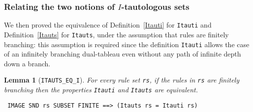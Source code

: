 \documentclass[a4paper]{article}
\newtheorem{lemma}{Lemma}
\newtheorem{definition}{Definition}
\newcommand{\hol}{\texttt{HOL4}}
\begin{document}

\subsubsection{Relating the two notions of $I$-tautologous sets}
\label{Itauti-Itauts}

We then proved the equivalence of 
Definition~\ref{Itauti} for \texttt{Itauti} and
Definition~\ref{Itauts} for \texttt{Itauts},
under the assumption that rules are finitely branching:
this assumption is required since the definition \texttt{Itauti}
allows the case of an infinitely branching dual-tableau 
even without any path of infinite depth down a branch.

\begin{lemma}[\texttt{ITAUTS\_EQ\_I}] \label{ITAUTS-EQ-I}
For every rule set \texttt{rs},
if the rules in \texttt{rs} are finitely branching then
the properties \texttt{Itauti} and \texttt{Itauts} are equivalent.
\end{lemma}
\begin{verbatim}
 IMAGE SND rs SUBSET FINITE ==> (Itauts rs = Itauti rs)
\end{verbatim}
  
\end{document}
